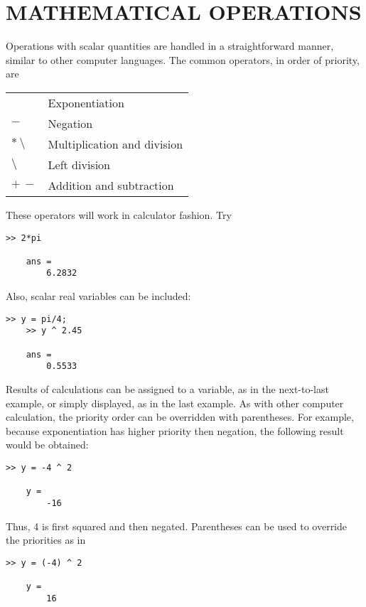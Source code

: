 \documentclass[../main.tex]{subfiles}
\begin{document}
\section{MATHEMATICAL OPERATIONS}

Operations with scalar quantities are handled in a straightforward manner, similar to other
computer languages. The common operators, in order of priority, are

\begin{table}[H]
	\centering
	\begin{tabular}{ll}
		\hline
			& Exponentiation\\
		$ - $ &Negation\\
		$ \ast  \ \setminus $ &Multiplication and division\\
		$ \setminus$ &Left division\\
		$ + \ - $ &Addition and subtraction\\
		\hline
	\end{tabular}
\end{table}



These operators will work in calculator fashion. Try
\begin{lstlisting}[frame=none, numbers=none]
	>> 2*pi

	ans =
		6.2832
\end{lstlisting}
Also, scalar real variables can be included:
\begin{lstlisting}[frame=none, numbers=none]
	>> y = pi/4;
	>> y ^ 2.45

	ans =
		0.5533
\end{lstlisting}
Results of calculations can be assigned to a variable, as in the next-to-last example, or simply displayed, as in the last example.
As with other computer calculation, the priority order can be overridden with parentheses. For example, because exponentiation has higher priority then negation, the following result would be obtained:
\begin{lstlisting}[frame=none, numbers=none]
	>> y = -4 ^ 2
	
	y =
		-16
\end{lstlisting}
Thus, 4 is first squared and then negated. Parentheses can be used to override the priorities
as in
\begin{lstlisting}[frame=none, numbers=none]
	>> y = (-4) ^ 2

	y =
		16
\end{lstlisting}
\end{document}
